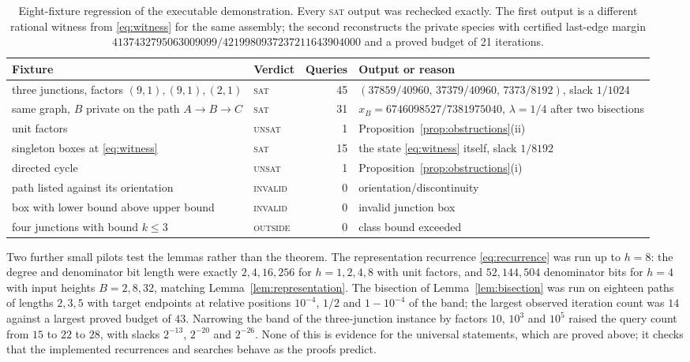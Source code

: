 \documentclass[11pt,a4paper]{article}
\theoremstyle{plain}
\theoremstyle{definition}
\theoremstyle{remark}
\begin{document}
\begin{table}[t]
\centering\footnotesize
\begin{tabular}{@{}>{\raggedright\arraybackslash}p{.30\linewidth}lr>{\raggedright\arraybackslash}p{.40\linewidth}@{}}\toprule
Fixture & Verdict & Queries & Output or reason \\\midrule
three junctions, factors $(9,1),(9,1),(2,1)$ & \textsc{sat} & 45 & $(37859/40960,\,37379/40960,\,7373/8192)$, slack $1/1024$ \\
same graph, $B$ private on the path $A\to B\to C$ & \textsc{sat} & 31 & $x_B=6746098527/7381975040$, $\lambda=1/4$ after two bisections \\
unit factors & \textsc{unsat} & 1 & Proposition~\ref{prop:obstructions}(ii) \\
singleton boxes at \eqref{eq:witness} & \textsc{sat} & 15 & the state \eqref{eq:witness} itself, slack $1/8192$ \\
directed cycle & \textsc{unsat} & 1 & Proposition~\ref{prop:obstructions}(i) \\
path listed against its orientation & \textsc{invalid} & 0 & orientation/discontinuity \\
box with lower bound above upper bound & \textsc{invalid} & 0 & invalid junction box \\
four junctions with bound $k\le3$ & \textsc{outside} & 0 & class bound exceeded \\\bottomrule
\end{tabular}
\caption{Eight-fixture regression of the executable demonstration. Every \textsc{sat} output was rechecked exactly. The first output is a different rational witness from \eqref{eq:witness} for the same assembly; the second reconstructs the private species with certified last-edge margin $4137432795063009099/4219980937237211643904000$ and a proved budget of 21 iterations.}
\label{tab:demo}
\end{table}

Two further small pilots test the lemmas rather than the theorem. The representation recurrence \eqref{eq:recurrence} was run up to $h=8$: the degree and denominator bit length were exactly $2,4,16,256$ for $h=1,2,4,8$ with unit factors, and $52,144,504$ denominator bits for $h=4$ with input heights $B=2,8,32$, matching Lemma~\ref{lem:representation}. The bisection of Lemma~\ref{lem:bisection} was run on eighteen paths of lengths $2,3,5$ with target endpoints at relative positions $10^{-4}$, $1/2$ and $1-10^{-4}$ of the band; the largest observed iteration count was $14$ against a largest proved budget of $43$. Narrowing the band of the three-junction instance by factors $10$, $10^3$ and $10^5$ raised the query count from $15$ to $22$ to $28$, with slacks $2^{-13}$, $2^{-20}$ and $2^{-26}$. None of this is evidence for the universal statements, which are proved above; it checks that the implemented recurrences and searches behave as the proofs predict.
\end{document}

